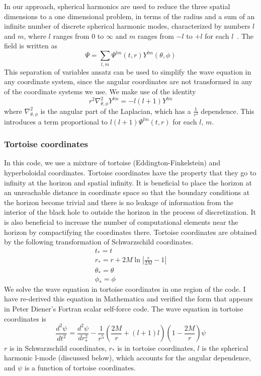 In our approach, spherical harmonics are used to reduce the three spatial dimensions to a one dimensional problem, in terms of the radius and a sum of an infinite number of discrete spherical harmonic modes, characterized by numbers $l$ and $m$, where $l$ ranges from $0$ to $\infty$ and  $m$ ranges from $-l$ to $+l$ for each $l$~\cite{poisson_pound_vega_living_review}. The field is written as
\begin{equation}
  \Psi=\sum_{l,m}\Psi^{lm}(t,r)Y^{lm}(\theta,\phi)
\end{equation}
This separation of variables ansatz can be used to simplify the wave equation in any coordinate system, since the angular coordinates are not transformed in any of the coordinate systems we use. We make use of the identity
\begin{equation}
  r^2\nabla_{\theta,\phi}^2Y^{lm}=-l(l+1)Y^{lm}
\end{equation}
where $\nabla_{\theta,\phi}^2$ is the angular part of the Laplacian, which has a $\frac{1}{r^2}$ dependence. This introduces a term proportional to $l(l+1)\Psi^{lm}(t,r)$ for each $l$, $m$. 

\subsubsection{Tortoise coordinates}
In this code, we use a mixture of tortoise (Eddington-Finkelstein) and hyperboloidal coordinates. Tortoise coordinates have the property that they go to infinity at the horizon and spatial infinity. It is beneficial to place the horizon at an unreachable distance in coordinate space so that the boundary conditions at the horizon become trivial and there is no leakage of information from the interior of the black hole to outside the horizon in the process of discretization. It is also beneficial to increase the number of computational elements near the horizon by compactifying the coordinates there. Tortoise coordinates are obtained by the following transformation of Schwarzschild coordinates.~\cite{wald}
\begin{eqnarray}
  t_*=t\\
  r_*=r+2M\ln|\frac{r}{2M}-1|\\
  \theta_*=\theta\\
  \phi_*=\phi
\end{eqnarray}
We solve the wave equation in tortoise coordinates in one region of the code. I have re-derived this equation in Mathematica and verified the form that appears in Peter Diener's Fortran scalar self-force code. The wave equation in tortoise coordinates is
\begin{equation}
  \frac{d^2\psi}{dt^2}=\frac{d^2\psi}{dr_*^2}-\frac{1}{r^5}(\frac{2M}{r}+(l+1)l)(1-\frac{2M}{r})\psi
\end{equation}
$r$ is in Schwarzschild coordinates, $r_*$ is in tortoise coordinates, $l$ is the spherical harmonic l-mode (discussed below), which accounts for the angular dependence, and $\psi$ is a function of tortoise coordinates.


